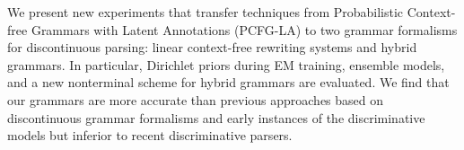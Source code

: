 We present new experiments that transfer techniques from {P}robabilistic {C}ontext-free {G}rammars with {L}atent {A}nnotations ({PCFG-LA}) to two grammar formalisms for discontinuous parsing: linear context-free rewriting systems and hybrid grammars. In particular, {D}irichlet priors during {EM} training, ensemble models, and a new nonterminal scheme for hybrid grammars are evaluated. We find that our grammars are more accurate than previous approaches based on discontinuous grammar formalisms and early instances of the discriminative models but inferior to recent discriminative parsers.
